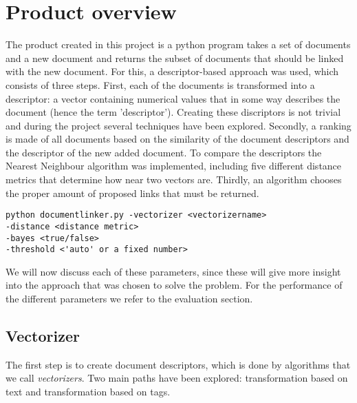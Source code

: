 \section{Product overview}

The product created in this project is a python program takes a set of documents and a new document and returns the subset of documents that should be linked with the new document. For this, a descriptor-based approach was used, which consists of three steps. First, each of the documents is transformed into a descriptor: a vector containing numerical values that in some way describes the document (hence the term 'descriptor'). Creating these discriptors is not trivial and during the project several techniques have been explored. Secondly, a ranking is made of all documents based on the similarity of the document descriptors and the descriptor of the new added document. To compare the descriptors the Nearest Neighbour algorithm was implemented, including five different distance metrics that determine how near two vectors are. Thirdly, an algorithm chooses the proper amount of proposed links that must be returned.

\begin{lstlisting}
python documentlinker.py -vectorizer <vectorizername> 
-distance <distance metric> 
-bayes <true/false>
-threshold <'auto' or a fixed number>
\end{lstlisting}

We will now discuss each of these parameters, since these will give more insight into the approach that was chosen to solve the problem. For the performance of the different parameters we refer to the evaluation section. 

\subsection{Vectorizer}
The first step is to create document descriptors, which is done by algorithms that we call \emph{vectorizers}. Two main paths have been explored: transformation based on text and transformation based on tags.

